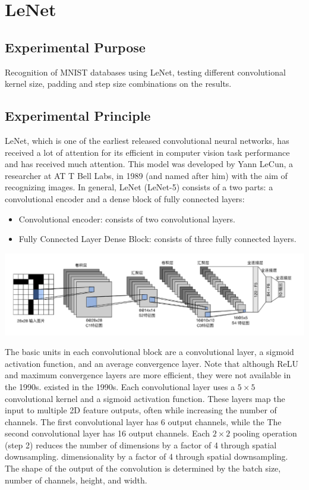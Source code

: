 \documentclass[a4paper,12pt]{article}
\begin{document}
\newpage
\section{LeNet}
\subsection{Experimental Purpose}
Recognition of MNIST databases using LeNet, testing different convolutional kernel size, padding and step size
combinations on the results.

\subsection{Experimental Principle}
LeNet, which is one of the earliest released convolutional neural networks, has received a lot of attention for its efficient in computer vision task
performance and has received much attention. This model was developed by Yann LeCun, a researcher at AT T Bell Labs, in
1989 (and named after him) with the aim of recognizing images. In general, LeNet (LeNet-5) consists of a
two parts: a convolutional encoder and a dense block of fully connected layers:

\begin{itemize}
    \item Convolutional encoder: consists of two convolutional layers.
    \item Fully Connected Layer Dense Block: consists of three fully connected layers.
\end{itemize}

\centering %
\includegraphics[width=0.8\linewidth]{images/LeNet.png}

\justifying

The basic units in each convolutional block are a convolutional layer, a sigmoid activation function, and an average convergence
layer. Note that although ReLU and maximum convergence layers are more efficient, they were not available in the 1990s.
existed in the 1990s. Each convolutional layer uses a $5 \times 5$ convolutional kernel and a sigmoid activation function. These layers map the input
to multiple 2D feature outputs, often while increasing the number of channels. The first convolutional layer has 6 output channels, while the
The second convolutional layer has 16 output channels. Each $2 \times 2$ pooling operation (step 2) reduces the number of dimensions by a factor of 4 through spatial downsampling.
dimensionality by a factor of 4 through spatial downsampling. The shape of the output of the convolution is determined by the batch size, number of channels, height, and width.
\end{document}
